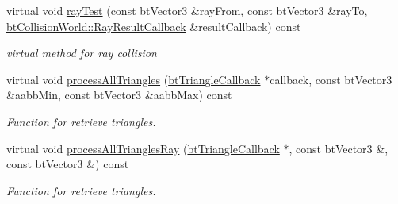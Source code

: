 \begin{DoxyCompactItemize}
\mbox{\label{classbtGImpactShapeInterface_afed230ba546b551d8c9b585d227f8d5e}} 
virtual void \hyperlink{classbtGImpactShapeInterface_afed230ba546b551d8c9b585d227f8d5e}{ray\+Test} (const bt\+Vector3 \&ray\+From, const bt\+Vector3 \&ray\+To, \hyperlink{structbtCollisionWorld_1_1RayResultCallback}{bt\+Collision\+World\+::\+Ray\+Result\+Callback} \&result\+Callback) const
\begin{DoxyCompactList}\small\item\em virtual method for ray collision \end{DoxyCompactList}\item 
virtual void \hyperlink{classbtGImpactShapeInterface_ae1dc14b29f49fc0262be72dbe9d7b75b}{process\+All\+Triangles} (\hyperlink{classbtTriangleCallback}{bt\+Triangle\+Callback} $\ast$callback, const bt\+Vector3 \&aabb\+Min, const bt\+Vector3 \&aabb\+Max) const
\begin{DoxyCompactList}\small\item\em Function for retrieve triangles. \end{DoxyCompactList}\item 
virtual void \hyperlink{classbtGImpactShapeInterface_af67273183582c6696169ee4ae5d6cf37}{process\+All\+Triangles\+Ray} (\hyperlink{classbtTriangleCallback}{bt\+Triangle\+Callback} $\ast$, const bt\+Vector3 \&, const bt\+Vector3 \&) const
\begin{DoxyCompactList}\small\item\em Function for retrieve triangles. \end{DoxyCompactList}\end{DoxyCompactItemize}
\textbf{ }\par
